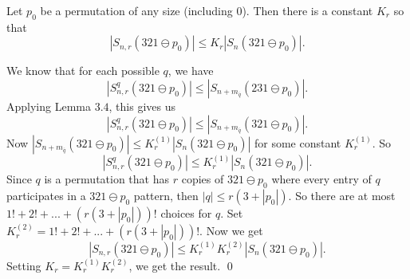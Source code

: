 \documentclass[10pt,a4paper]{amsart}
\newenvironment{proof}{\noindent{\bf Proof:}}{\qed}
\begin{document}
\begin{theorem}
    Let $p_0$ be a permutation of any size (including $0$). Then there is a constant $K_r$ so that 
    \[
    |S_{n,r}(321\ominus p_0)| \leq K_r |S_{n}(321\ominus p_0)|.
    \]
\end{theorem}

\begin{proof}
    We know that for each possible $q$, we have
    \[
    |S^q_{n,r}(321\ominus p_0)| \leq |S_{n + m_{\overline{q}}}(231\ominus p_0)|.
    \]
    Applying Lemma $3.4$, this gives us 
    \[
    |S^q_{n,r}(321\ominus p_0)| \leq |S_{n + m_{\overline{q}}}(321\ominus p_0)|.
    \]
    Now $|S_{n + m_{\overline{q}}}(321\ominus p_0)| \leq K^{(1)}_r |S_{n}(321\ominus p_0)| $ for some constant $K^{(1)}_r$. So
    \[
    |S^q_{n,r}(321\ominus p_0)| \leq K^{(1)}_r |S_{n}(321\ominus p_0)|.
    \]
    Since $q$ is a permutation that has $r$ copies of $321\ominus p_0$ where every entry of $q$ participates in a $321\ominus p_0$ pattern, then $|q| \leq r(3 + |p_0|)$. So there are at most $1! + 2! + ... + (r(3 + |p_0|))!$ choices for $q$. Set $K^{(2)}_r = 1! + 2! + ... + (r(3 + |p_0|))!$. Now we get
    \[
    |S_{n,r}(321\ominus p_0)| \leq K^{(1)}_r K^{(2)}_r |S_{n}(321\ominus p_0)|.
    \]
    Setting $K_r = K^{(1)}_r K^{(2)}_r$, we get the result.
\end{proof}
\end{document}
